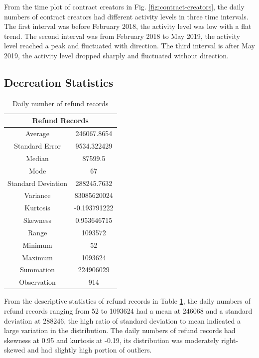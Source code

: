 From the time plot of contract creators in Fig. \ref{fig:contract-creators}, the daily numbers of contract creators had different activity levels in three time intervals. The first interval was before February 2018, the activity level was low with a flat trend. The second interval was from February 2018 to May 2019, the activity level reached a peak and fluctuated with direction. The third interval is after May 2019, the activity level dropped sharply and fluctuated without direction.

\subsection{Decreation Statistics}
\label{sec:evaluation:abnormality:decreation}

\begin{table}[h]
\caption{Daily number of refund records}
\label{tab:refund-records}
\renewcommand\arraystretch{0.7}
\begin{tabular}{@{}cc@{}}
\toprule
\multicolumn{2}{c}{Refund Records} \\
\midrule
Average                & 246067.8654    \\
Standard Error         & 9534.322429    \\
Median                 & 87599.5        \\
Mode                   & 67             \\
Standard   Deviation   & 288245.7632    \\
Variance               & 83085620024    \\
Kurtosis               & -0.193791222   \\
Skewness               & 0.953646715    \\
Range                  & 1093572        \\
Minimum                & 52             \\
Maximum                & 1093624        \\
Summation              & 224906029      \\
Observation            & 914            \\
\bottomrule
\end{tabular}
\end{table}

From the descriptive statistics of refund records in Table \ref{tab:refund-records}, the daily numbers of refund records ranging from 52 to 1093624 had a mean at 246068 and a standard deviation at 288246, the high ratio of standard deviation to mean indicated a large variation in the distribution. The daily numbers of refund records had skewness at 0.95 and kurtosis at -0.19, its distribution was moderately right-skewed and had slightly high portion of outliers.

